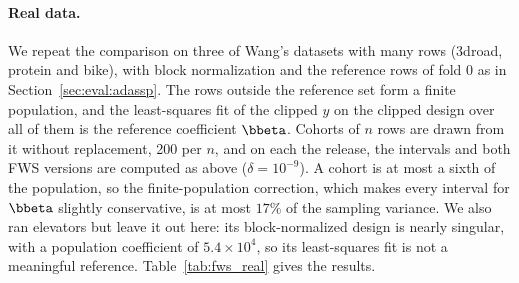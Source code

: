 \paragraph{Real data.} We repeat the comparison on three of Wang's datasets with many rows (3droad, protein and bike), with block normalization and the reference rows of fold 0 as in Section~\ref{sec:eval:adassp}. The rows outside the reference set form a finite population, and the least-squares fit of the clipped $y$ on the clipped design over all of them is the reference coefficient $\bbeta$. Cohorts of $n$ rows are drawn from it without replacement, 200 per $n$, and on each the release, the intervals and both FWS versions are computed as above ($\delta = 10^{-9}$). A cohort is at most a sixth of the population, so the finite-population correction, which makes every interval for $\bbeta$ slightly conservative, is at most $17\%$ of the sampling variance. We also ran elevators but leave it out here: its block-normalized design is nearly singular, with a population coefficient of $5.4 \times 10^4$, so its least-squares fit is not a meaningful reference. Table~\ref{tab:fws_real} gives the results.

